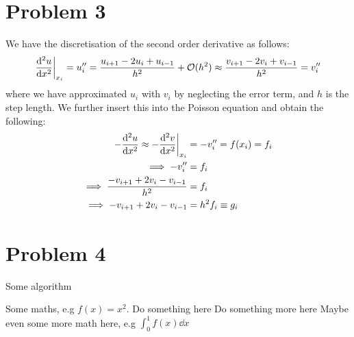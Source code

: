 \documentclass[english,notitlepage]{revtex4-1}  %
\begin{document}
\section*{Problem 3}
    We have the discretisation of the second order derivative as follows:
    \begin{align*}
        \dv[2]{u}{x}\bigg\rvert_{x_i} = u_i'' = \frac{u_{i+1}-2u_i+u_{i-1}}{h^2} + \mathcal{O}(h^2) \approx \frac{v_{i+1}-2v_i+v_{i-1}}{h^2} = v_i''
    \end{align*}
    where we have approximated $u_i$ with $v_i$ by  neglecting the error term, and $h$ is the step length. We further insert this  into the Poisson equation  and obtain the following:
    \begin{align*}
        -\dv[2]{u}{x}\approx - \dv[2]{v}{x}\bigg\rvert_{x_i} &= -v_i'' = f(x_i) = f_i \\
        \implies -v_i'' &= f_i \\
        \implies \frac{-v_{i+1}+2v_i-v_{i-1}}{h^2} &= f_i \\
        \implies -v_{i+1}+2v_i-v_{i-1} &= h^2f_i \equiv g_i
    \end{align*}





\section*{Problem 4}



\begin{algorithm}[H]
    \caption{Some algorithm}\label{algo:midpoint_rule}
    \begin{algorithmic}
        \State Some maths, e.g $f(x) = x^2$.  
        \State Do something here 
        \EndFor
        \State Do something more here 
        \EndWhile
        \State Maybe even some more math here, e.g $\int_0^1 f(x) \dd x$
    \end{algorithmic}
\end{algorithm}
   
\end{document}
